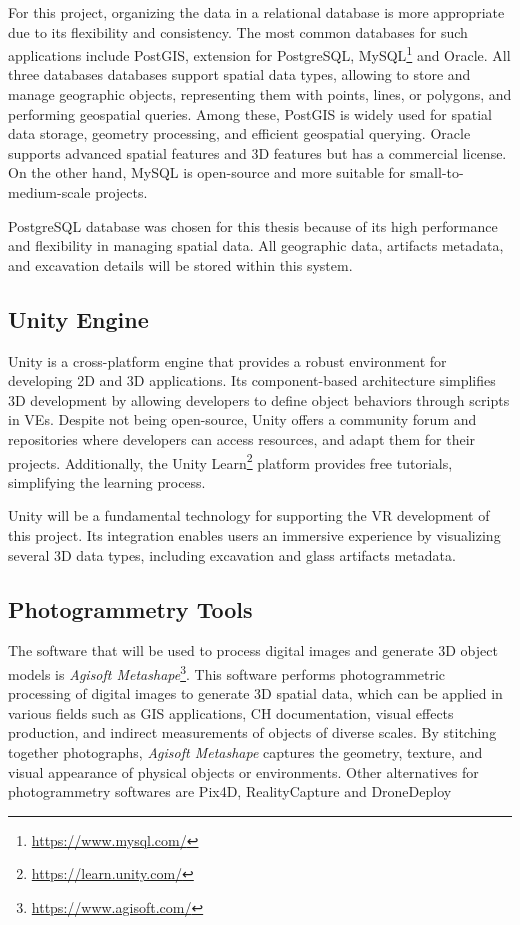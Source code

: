 For this project, organizing the data in a relational database is more appropriate due to its flexibility and consistency.
The most common databases for such applications include PostGIS, extension for PostgreSQL, MySQL\footnote{\url{https://www.mysql.com/}} and Oracle.
All three databases databases support spatial data types, allowing to store and manage geographic objects, representing them with points, lines, or polygons, and performing geospatial queries.
Among these, PostGIS is widely used for spatial data storage, geometry processing, and efficient geospatial querying.
Oracle supports advanced spatial features and 3D features but has a commercial license. On the other hand, MySQL is open-source and more suitable for small-to-medium-scale projects.

PostgreSQL database was chosen for this thesis because of its high performance and flexibility in managing spatial data. All geographic data, artifacts metadata, and excavation details will be stored within this system.


\subsection{Unity Engine}
\label{sec:unity_description} 

Unity is a cross-platform engine that provides a robust environment for developing \gls{2D} and \gls{3D} applications. 
Its component-based architecture simplifies \gls{3D} development by allowing developers to define object behaviors through scripts in \glspl{VE}.
Despite not being open-source, Unity offers a community forum and repositories where developers can access resources, and adapt them for their projects.
Additionally, the Unity Learn\footnote{\url{https://learn.unity.com/}} platform provides free tutorials, simplifying the learning process.

Unity will be a fundamental technology for supporting the \gls{VR} development of this project. Its integration enables users an immersive experience by visualizing several \gls{3D} data types, including excavation and glass artifacts metadata. 


\subsection{Photogrammetry Tools}
\label{sec:photogrammetry_tool} 

The software that will be used to process digital images and generate \gls{3D} object models is \textit{Agisoft Metashape}\footnote{\url{https://www.agisoft.com/}}.
This software performs photogrammetric processing of digital images to generate \gls{3D} spatial data, which can be applied in various fields such as \gls{GIS} applications, \gls{CH} documentation, visual effects production, and indirect measurements of objects of diverse scales. 
By stitching together photographs, \textit{Agisoft Metashape} captures the geometry, texture, and visual appearance of physical objects or environments.
Other alternatives for photogrammetry softwares are Pix4D, RealityCapture and DroneDeploy

